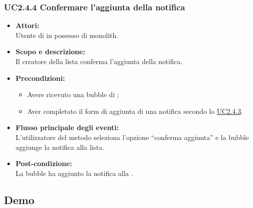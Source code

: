 \subsubsection{UC2.4.4 Confermare l’aggiunta della notifica} \label{UC2.4.4}

\begin{itemize}
	\item \textbf{Attori:}
	\\Utente di  in possesso di monolith.
	\item \textbf{Scopo e descrizione:} 
	\\Il creatore della lista conferma l’aggiunta della notifica.
	\item \textbf{Precondizioni:}
	\begin{itemize}
		\item Avere ricevuto una bubble di ;
		\item Aver completato il form di aggiunta di una notifica secondo lo \hyperref[UC2.4.3]{UC2.4.3}.
	\end{itemize}
	\item \textbf{Flusso principale degli eventi:}
	\\L’utilizzatore del metodo seleziona l’opzione “conferma aggiunta” e la bubble aggiunge la notifica alla lista.
	\item \textbf{Post-condizione:}
	\\La bubble ha aggiunto la notifica alla .
\end{itemize}

\subsection{Demo}

